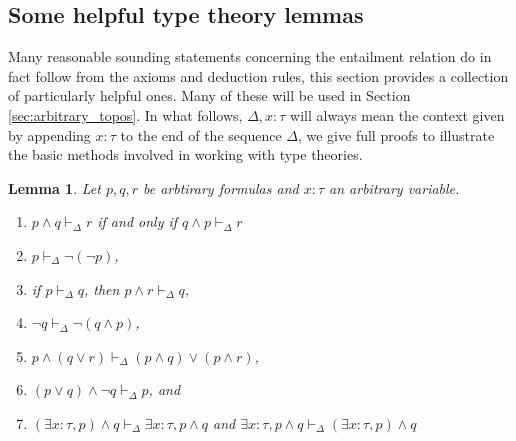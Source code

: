 \documentclass{birkjour}
\theoremstyle{plain}
\newtheorem{lemma}[thm]{Lemma}
\theoremstyle{definition}
\begin{document}
	\subsection{Some helpful type theory lemmas}\label{sec:helpful_lemmas}
	\label{helpfulLemmas}
	Many reasonable sounding statements concerning the entailment relation do in fact follow from the axioms and deduction rules, this section provides a collection of particularly helpful ones. Many of these will be used in Section \ref{sec:arbitrary_topos}. In what follows, $\Delta,x:\tau$ will always mean the context given by appending $x:\tau$ to the end of the sequence $\Delta$, we give full proofs to illustrate the basic methods involved in working with type theories.
	\begin{lemma}
		\label{weakening}
		Let $p,q,r$ be arbtirary formulas and $x:\tau$ an arbitrary variable.
		\begin{enumerate}
			\item $p \wedge q \vdash_\Delta r$ if and only if $q \wedge p \vdash_\Delta r$
			\item $p \vdash_\Delta \neg(\neg p)$,
			\item if $p \vdash_\Delta q$, then $p \wedge r \vdash_\Delta q$,
			\item $\neg q \vdash_\Delta \neg(q \wedge p)$,
			\item $p \wedge (q \vee r) \vdash_\Delta (p \wedge q) \vee (p \wedge r)$,
			\item $(p \vee q) \wedge \neg q \vdash_\Delta p$, and
			\item $(\exists x:\tau, p) \wedge q \vdash_{\Delta}\exists x:\tau, p \wedge q$ and $\exists x:\tau, p \wedge q \vdash_{\Delta} (\exists x:\tau, p) \wedge q$
		\end{enumerate}
	\end{lemma}
\end{document}
